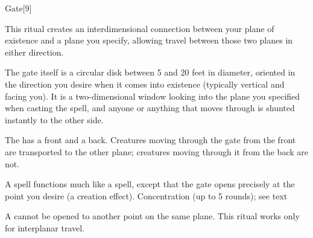 \begin{spellsection}{Gate}[9]
    \begin{spellheader}
    \end{spellheader}
    \begin{spellcontent}
        \begin{spelltargetinginfo}
            \spellrng{\rngmed}
        \end{spelltargetinginfo}
        \begin{spelleffects}

            \spellline
            \spelleffect This ritual creates an interdimensional connection between your plane of existence and a plane you specify, allowing travel between those two planes in either direction.
            \par The gate itself is a circular disk between 5 and 20 feet in diameter, oriented in the direction you desire when it comes into existence (typically vertical and facing you). It is a two-dimensional window looking into the plane you specified when casting the spell, and anyone or anything that moves through is shunted instantly to the other side.
            \par The  has a front and a back. Creatures moving through the gate from the front are transported to the other plane; creatures moving through it from the back are not.
            \par A  spell functions much like a  spell, except that the gate opens precisely at the point you desire (a creation effect). 
            \spelldur Concentration (up to 5 rounds); see text
        \end{spelleffects}
    \end{spellcontent}
    \begin{spellfooter}
        \spellnotes A  cannot be opened to another point on the same plane. This ritual works only for interplanar travel.
    \end{spellfooter}
\end{spellsection}


